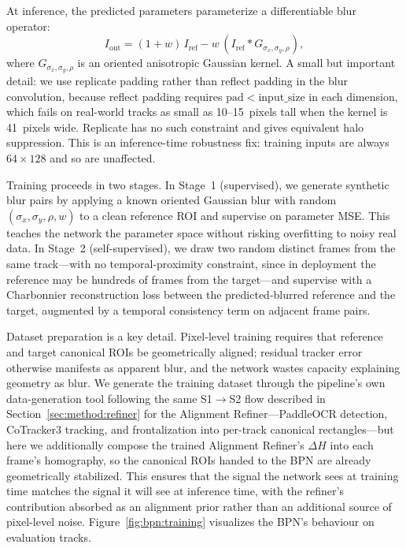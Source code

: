 At inference, the predicted parameters parameterize a
differentiable blur operator:
\begin{equation}
  I_{\mathrm{out}} = (1 + w)\,I_{\mathrm{ref}} - w\,(I_{\mathrm{ref}} \ast G_{\sigma_x, \sigma_y, \rho}),
  \label{eq:bpn}
\end{equation}
where $G_{\sigma_x, \sigma_y, \rho}$ is an oriented anisotropic
Gaussian kernel. A small but important detail: we use replicate
padding rather than reflect padding in the blur convolution,
because reflect padding requires
$\mathrm{pad} < \mathrm{input\_size}$ in each dimension, which
fails on real-world tracks as small as 10--15~pixels tall when the
kernel is 41~pixels wide. Replicate has no such constraint and
gives equivalent halo suppression. This is an inference-time
robustness fix: training inputs are always $64\times 128$ and so
are unaffected.

Training proceeds in two stages. In Stage~1 (supervised), we
generate synthetic blur pairs by applying a known oriented
Gaussian blur with random $(\sigma_x, \sigma_y, \rho, w)$ to a
clean reference ROI and supervise on parameter MSE. This teaches
the network the parameter space without risking overfitting to
noisy real data. In Stage~2 (self-supervised), we draw two random
distinct frames from the same track---with no temporal-proximity
constraint, since in deployment the reference may be hundreds of
frames from the target---and supervise with a Charbonnier
reconstruction loss between the predicted-blurred reference and
the target, augmented by a temporal consistency term on adjacent
frame pairs.

Dataset preparation is a key detail. Pixel-level training requires
that reference and target canonical ROIs be geometrically aligned;
residual tracker error otherwise manifests as apparent blur, and
the network wastes capacity explaining geometry as blur. We
generate the training dataset through the pipeline's own
data-generation tool following the same S1$\rightarrow$S2 flow
described in Section~\ref{sec:method:refiner} for the Alignment
Refiner---PaddleOCR detection, CoTracker3 tracking, and
frontalization into per-track canonical rectangles---but here we
additionally compose the trained Alignment Refiner's $\Delta H$
into each frame's homography, so the canonical ROIs handed to the
BPN are already geometrically stabilized. This ensures that the
signal the network sees at training time matches the signal it
will see at inference time, with the refiner's contribution
absorbed as an alignment prior rather than an additional source of
pixel-level noise.
Figure~\ref{fig:bpn:training} visualizes the BPN's behaviour on
evaluation tracks.

